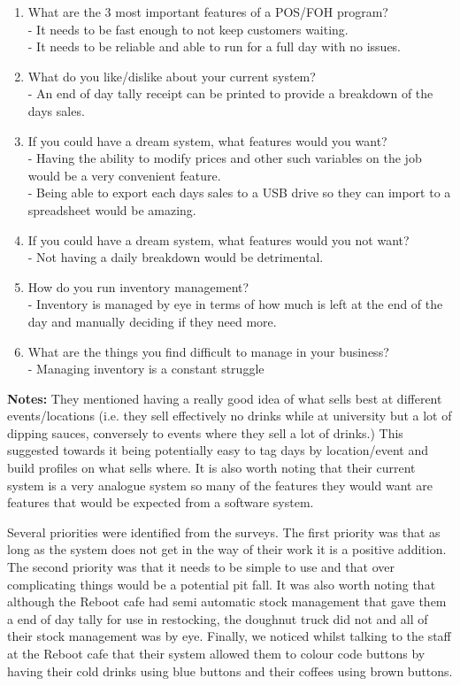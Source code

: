 \begin{enumerate}
	\item What are the 3 most important features of a POS/FOH program?\\
	 - It needs to be fast enough to not keep customers waiting.\\
	 - It needs to be reliable and able to run for a full day with no issues.
	\item What do you like/dislike about your current system?\\
	 - An end of day tally receipt can be printed to provide a breakdown of the days sales.
	\item If you could have a dream system, what features would you want?\\
	 - Having the ability to modify prices and other such variables on the job would be a very convenient feature.\\
	 - Being able to export each days sales to a USB drive so they can import to a spreadsheet would be amazing.
	\item If you could have a dream system, what features would you not want?\\
	 - Not having a daily breakdown would be detrimental.
	\item How do you run inventory management?\\
	 - Inventory is managed by eye in terms of how much is left at the end of the day and manually deciding if they need more.
	\item What are the things you find difficult to manage in your business?\\
	 - Managing inventory is a constant struggle
\end{enumerate}
\textbf{Notes:}
They mentioned having a really good idea of what sells best at different events/locations (i.e. they sell effectively no drinks while at university but a lot of dipping sauces, conversely to events where they sell a lot of drinks.) This suggested towards it being potentially easy to tag days by location/event and build profiles on what sells where. It is also worth noting that their current system is a very analogue system so many of the features they would want are features that would be expected from a software system.

Several priorities were identified from the surveys. The first priority was that as long as the system does not get in the way of their work it is a positive addition. The second priority was that it needs to be simple to use and that over complicating things would be a potential pit fall. It was also worth noting that although the Reboot cafe had semi automatic stock management that gave them a end of day tally for use in restocking, the doughnut truck did not and all of their stock management was by eye. Finally, we noticed whilst talking to the staff at the Reboot cafe that their system allowed them to colour code buttons by having their cold drinks using blue buttons and their coffees using brown buttons.
